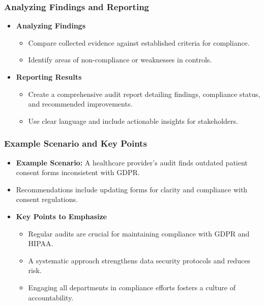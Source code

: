 \documentclass{beamer}
\begin{document}
\begin{frame}[fragile]
    \frametitle{Analyzing Findings and Reporting}
    \begin{itemize}
        \item \textbf{Analyzing Findings}
            \begin{itemize}
                \item Compare collected evidence against established criteria for compliance.
                \item Identify areas of non-compliance or weaknesses in controls.
            \end{itemize}
        
        \item \textbf{Reporting Results}
            \begin{itemize}
                \item Create a comprehensive audit report detailing findings, compliance status, and recommended improvements.
                \item Use clear language and include actionable insights for stakeholders.
            \end{itemize}
    \end{itemize}
\end{frame}

\begin{frame}[fragile]
    \frametitle{Example Scenario and Key Points}
    \begin{itemize}
        \item \textbf{Example Scenario:} A healthcare provider's audit finds outdated patient consent forms inconsistent with GDPR.
        \item Recommendations include updating forms for clarity and compliance with consent regulations.
        
        \item \textbf{Key Points to Emphasize}
            \begin{itemize}
                \item Regular audits are crucial for maintaining compliance with GDPR and HIPAA.
                \item A systematic approach strengthens data security protocols and reduces risk.
                \item Engaging all departments in compliance efforts fosters a culture of accountability.
            \end{itemize}
    \end{itemize}
\end{frame}
\end{document}
